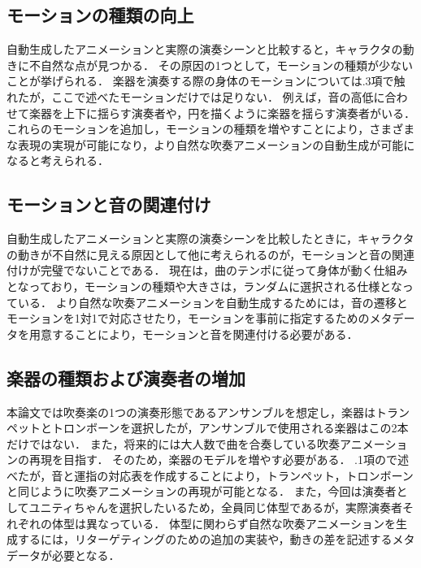 \newpage
\subsection{モーションの種類の向上}
自動生成したアニメーションと実際の演奏シーンと比較すると，キャラクタの動きに不自然な点が見つかる．
その原因の1つとして，モーションの種類が少ないことが挙げられる．
楽器を演奏する際の身体のモーションについては{.3項}で触れたが，ここで述べたモーションだけでは足りない．
例えば，音の高低に合わせて楽器を上下に揺らす演奏者や，円を描くように楽器を揺らす演奏者がいる．
これらのモーションを追加し，モーションの種類を増やすことにより，さまざまな表現の実現が可能になり，より自然な吹奏アニメーションの自動生成が可能になると考えられる．

\subsection{モーションと音の関連付け}
自動生成したアニメーションと実際の演奏シーンを比較したときに，キャラクタの動きが不自然に見える原因として他に考えられるのが，モーションと音の関連付けが完璧でないことである．
現在は，曲のテンポに従って身体が動く仕組みとなっており，モーションの種類や大きさは，ランダムに選択される仕様となっている．
より自然な吹奏アニメーションを自動生成するためには，音の遷移とモーションを1対1で対応させたり，モーションを事前に指定するためのメタデータを用意することにより，モーションと音を関連付ける必要がある．

\subsection{楽器の種類および演奏者の増加}
本論文では吹奏楽の1つの演奏形態であるアンサンブルを想定し，楽器はトランペットとトロンボーンを選択したが，アンサンブルで使用される楽器はこの2本だけではない．
また，将来的には大人数で曲を合奏している吹奏アニメーションの再現を目指す．
そのため，楽器のモデルを増やす必要がある．
{.1項}ので述べたが，音と運指の対応表を作成することにより，トランペット，トロンボーンと同じように吹奏アニメーションの再現が可能となる．
また，今回は演奏者としてユニティちゃんを選択したいるため，全員同じ体型であるが，実際演奏者それぞれの体型は異なっている．
体型に関わらず自然な吹奏アニメーションを生成するには，リターゲティングのための追加の実装や，動きの差を記述するメタデータが必要となる．